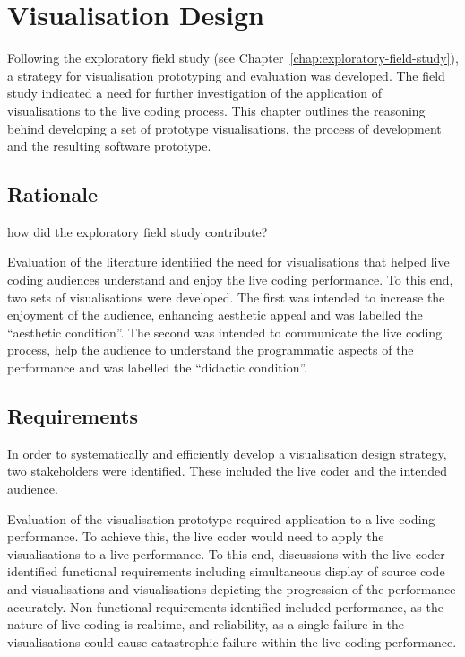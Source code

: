 
\chapter{Visualisation Design}
\label{chap:visualisation-design}

Following the exploratory field study (see Chapter~\ref{chap:exploratory-field-study}), a strategy for visualisation prototyping and evaluation was developed. The field study indicated a need for further investigation of the application of visualisations to the live coding process. This chapter outlines the reasoning behind developing a set of prototype visualisations, the process of development and the resulting software prototype.


\section{Rationale}

{\color{red} how did the exploratory field study contribute? }

Evaluation of the literature identified the need for visualisations that helped live coding audiences understand and enjoy the live coding performance. To this end, two sets of visualisations were developed. The first was intended to increase the enjoyment of the audience, enhancing aesthetic appeal and was labelled the ``aesthetic condition''. The second was intended to communicate the live coding process, help the audience to understand the programmatic aspects of the performance and was labelled the ``didactic condition''.

\section{Requirements}

In order to systematically and efficiently develop a visualisation design strategy, two stakeholders were identified. These included the live coder and the intended audience.

Evaluation of the visualisation prototype required application to a live coding performance. To achieve this, the live coder would need to apply the visualisations to a live performance. To this end, discussions with the live coder identified functional requirements including simultaneous display of source code and visualisations and visualisations depicting the progression of the performance accurately. Non-functional requirements identified included performance, as the nature of live coding is realtime, and reliability, as a single failure in the visualisations could cause catastrophic failure within the live coding performance.

